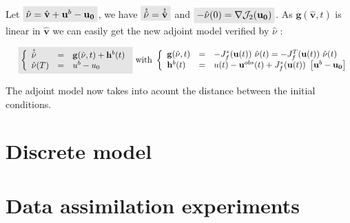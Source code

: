 \documentclass[11pt,a4paper]{article}
\renewcommand{\u} {\mathbf{u}}
\renewcommand{\h} {\mathbf{h}}
\renewcommand{\g} {\mathbf{g}}
\renewcommand{\uz}{\mathbf{u_0}}
\renewcommand{\uobs}{\mathbf{u}^{obs}}}
\renewcommand{\vh}{\hat{\mathbf{v}}}
\renewcommand{\J}{\mathcal{J}}
\renewcommand{\colbox}[1]{\colorbox{lightgray}{$ #1 $}}
\begin{document}
\vskip 0.2cm
\noindent Let $\colbox{\hat{\nu} = \vh + \u^b - \uz}$, we have $\colbox{\mathring{\hat{\nu}} = \mathring{\vh}}$ and $\colbox{-\hat{\nu}(0) = \nabla \J_2(\uz)}$.
\vskip 0.2cm
\noindent As $\g(\vh,t)$ is linear in $\vh$ we can easily get the new adjoint model verified by $\hat{\nu}$ :

$$
\begin{equation} \label{eq:adjoint}
\hskip 0.5cm
\colbox{
\left \{
\begin{array}{l c l}
    \mathring{\hat{\nu}}&=&\g(\hat{\nu},t) + \h^b(t)\\
    \hat{\nu}(T)&=&u^b - u_0
\end{array}
\right .
}
\textrm{ with }
\left \{
\begin{array}{l l l}
    \g(\hat{\nu},t)&=&-J_f^*(\u(t))\ \hat{\nu}(t)=-J_f^T(\u(t))\ \hat{\nu}(t)\\
    \h^b(t)&=& u(t) - \uobs(t) + J_f^*(\u(t))\ \left[ \u^b - \uz \right]
\end{array}
\right .
\end{equation}
$$

The adjoint model now takes into acount the distance between the initial conditions.

\section{Discrete model}
\section{Data assimilation experiments}
\end{document}

